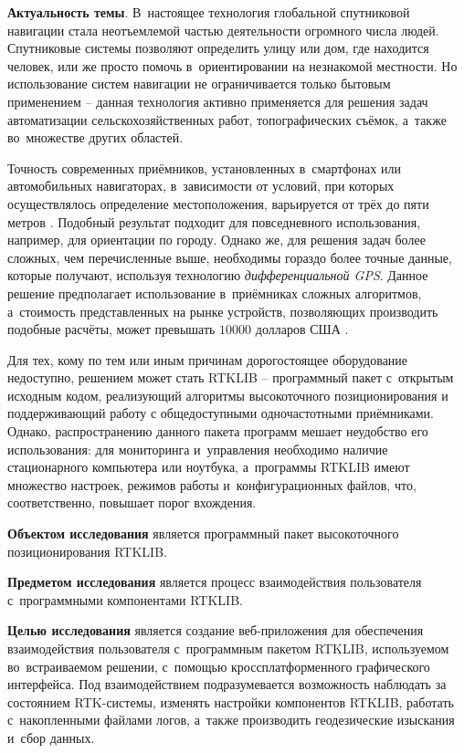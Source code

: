 
\textbf{Актуальность темы}. В~настоящее технология глобальной спутниковой навигации стала неотъемлемой частью деятельности огромного числа людей. Спутниковые системы позволяют определить улицу или дом, где находится человек, или же просто помочь в~ориентировании на незнакомой местности. Но использование систем навигации не ограничивается только бытовым применением -- данная технология активно применяется для решения задач автоматизации сельскохозяйственных работ, топографических съёмок, а~также во~множестве других областей.

Точность современных приёмников, установленных в~смартфонах или автомобильных навигаторах, в~зависимости от условий, при которых осуществлялось определение местоположения, варьируется от трёх до пяти метров \cite{GpsAccuracy,GpsGlonassAccuracy}. Подобный результат подходит для повседневного использования, например, для ориентации по городу. Однако же, для решения задач более сложных, чем перечисленные выше, необходимы гораздо более точные данные, которые получают, используя технологию \textit{дифференциальной GPS}. Данное решение предполагает использование в~приёмниках сложных алгоритмов, а~стоимость представленных на рынке устройств, позволяющих производить подобные расчёты, может превышать $10000$ долларов США \cite{GEOOPTIC,JAVAD}.

Для тех, кому по тем или иным причинам дорогостоящее оборудование недоступно, решением может стать RTKLIB \cite{RTKLIB} -- программный пакет с~открытым исходным кодом, реализующий алгоритмы высокоточного позиционирования и поддерживающий работу с общедоступными одночастотными приёмниками. Однако, распространению данного пакета программ мешает неудобство его использования: для мониторинга и~управления необходимо наличие стационарного компьютера или ноутбука, а~программы RTKLIB имеют множество настроек, режимов работы и~конфигурационных файлов, что, соответственно, повышает порог вхождения.

\textbf{Объектом исследования} является программный пакет высокоточного позиционирования RTKLIB.

\textbf{Предметом исследования} является процесс взаимодействия пользователя с~программными компонентами RTKLIB.

\textbf{Целью исследования} является создание веб-приложения для обеспечения взаимодействия пользователя с~программным пакетом RTKLIB, используемом во~встраиваемом решении, с~помощью кроссплатформенного графического интерфейса. Под взаимодействием подразумевается возможность наблюдать за состоянием RTK-системы, изменять настройки компонентов RTKLIB, работать с~накопленными файлами логов, а~также производить геодезические изыскания и~сбор данных.

